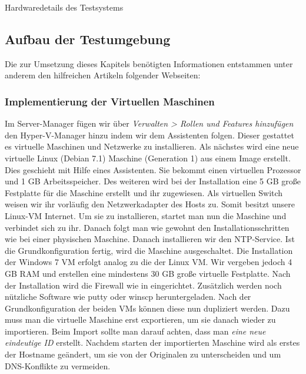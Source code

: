 \begin{table}[!ht]
    \caption{Hardwaredetails des Testsystems}
    \label{tab:tabletestsystem}
\end{table}

\subsection{Aufbau der Testumgebung}
\label{app:testaufbau}
Die zur Umsetzung dieses Kapitels benötigten Informationen entstammen unter anderem den hilfreichen Artikeln folgender Webseiten: \cite{networkdriverhacking}

\subsubsection{Implementierung der Virtuellen Maschinen}
Im Server-Manager fügen wir über \textit{Verwalten > Rollen und Features hinzufügen} den Hyper-V-Manager hinzu indem wir dem Assistenten folgen. Dieser gestattet es virtuelle Maschinen und Netzwerke zu installieren.
Als nächstes wird eine neue virtuelle Linux (Debian 7.1)  Maschine (Generation 1) aus einem Image erstellt. Dies geschieht mit Hilfe eines Assistenten. Sie bekommt einen virtuellen Prozessor und 1 \ac{GB} Arbeitsspeicher. Des weiteren wird bei der Installation eine 5 \ac{GB} große Festplatte für die Maschine erstellt und ihr zugewiesen. Als virtuellen Switch weisen wir ihr vorläufig den Netzwerkadapter des Hosts zu. Somit besitzt unsere Linux-\ac{VM} Internet. Um sie zu installieren, startet man nun die Maschine und verbindet sich zu ihr. Danach folgt man wie gewohnt den Installationsschritten wie bei einer physischen Maschine. Danach installieren wir den \ac{NTP}-Service. Ist die Grundkonfiguration fertig, wird die Maschine ausgeschaltet.
Die Installation der Windows 7 \ac{VM} erfolgt analog zu die der Linux \ac{VM}. Wir vergeben jedoch 4 \ac{GB} \ac{RAM} und erstellen eine mindestens 30 \ac{GB} große virtuelle Festplatte. Nach der Installation wird die Firewall wie in  eingerichtet. Zusätzlich werden noch nützliche Software wie putty oder winscp heruntergeladen.
Nach der Grundkonfiguration der beiden \ac{VM}s können diese nun dupliziert werden. Dazu muss man die virtuelle Maschine erst exportieren, um sie danach wieder zu importieren. Beim Import sollte man darauf achten, dass man \textit{eine neue eindeutige \ac{ID} } erstellt. Nachdem starten der importierten Maschine wird als erstes der Hostname geändert, um sie von der Originalen zu unterscheiden und um \ac{DNS}-Konflikte zu vermeiden.

